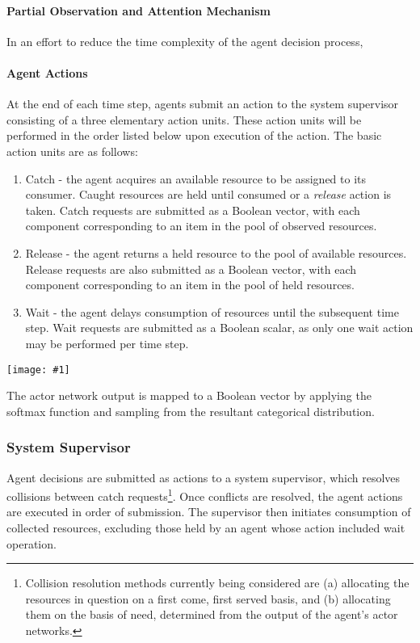 \documentclass{article}
\theoremstyle{definition}
\theoremstyle{remark}
\newcommand{\addpic}[1]{\texttt{[image: \#1]}}
\begin{document}
			\paragraph{Partial Observation and Attention Mechanism}
			
			In an effort to reduce the time complexity of the agent decision process, 

			\paragraph{Agent Actions}

			At the end of each time step, agents submit an action to the system supervisor consisting of a three elementary action units. These action units will be performed in the order listed below upon execution of the action. The basic action units are as follows:

			\begin{enumerate}
				\item Catch - the agent acquires an available resource to be assigned to its consumer. Caught resources are held until consumed or a \emph{release} action is taken. Catch requests are submitted as a Boolean vector, with each component corresponding to an item in the pool of observed resources.
				\item Release - the agent returns a held resource to the pool of available resources. Release requests are also submitted as a Boolean vector, with each component corresponding to an item in the pool of held resources.
				\item Wait - the agent delays consumption of resources until the subsequent time step. Wait requests are submitted as a Boolean scalar, as only one wait action may be performed per time step.
			\end{enumerate}
		
			\addpic{figures/agent_action.png}

			The actor network output is mapped to a Boolean vector by applying the softmax function and sampling from the resultant categorical distribution.

		\subsubsection{System Supervisor}

		Agent decisions are submitted as actions to a system supervisor, which resolves collisions between catch requests\footnote{Collision resolution methods currently being considered are (a) allocating the resources in question on a first come, first served basis, and (b) allocating them on the basis of need, determined from the output of the agent's actor networks.}. Once conflicts are resolved, the agent actions are executed in order of submission. The supervisor then initiates consumption of collected resources, excluding those held by an agent whose action included wait operation. 
		
\end{document}
